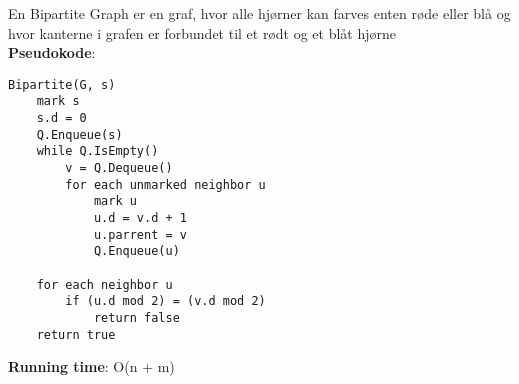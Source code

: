 En Bipartite Graph er en graf, hvor alle hjørner kan farves enten røde eller blå og hvor kanterne i grafen er forbundet til et rødt og et blåt hjørne\\
\textbf{Pseudokode}:
\begin{lstlisting}[frame=single, mathescape=true]
Bipartite(G, s)
	mark s
	s.d = 0
	Q.Enqueue(s)
	while Q.IsEmpty()
		v = Q.Dequeue()
		for each unmarked neighbor u
			mark u
			u.d = v.d + 1
			u.parrent = v
			Q.Enqueue(u)

	for each neighbor u
		if (u.d mod 2) = (v.d mod 2)
			return false
	return true
\end{lstlisting}
\textbf{Running time}: O(n + m)
